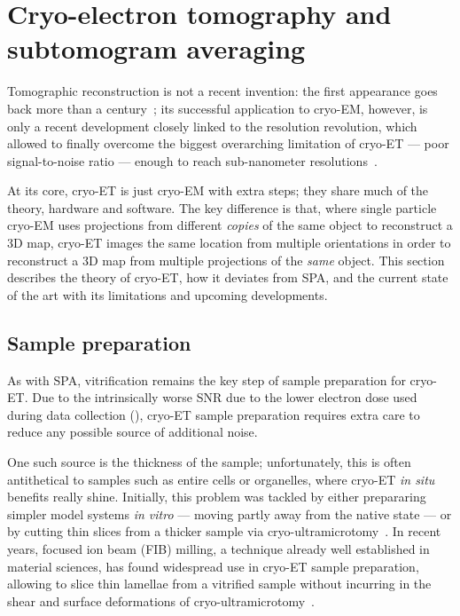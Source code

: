 \chapter[Cryo-ET and STA]{Cryo-electron tomography and subtomogram averaging}

Tomographic reconstruction is not a recent invention: the first appearance goes back more than a century~\cite{jDeterminationFunctionsTheir1917}; its successful application to cryo-EM, however, is only a recent development closely linked to the resolution revolution, which allowed to finally overcome the biggest overarching limitation of cryo-ET --- poor signal-to-noise ratio --- enough to reach sub-nanometer resolutions~\cite{lucicCryoelectronTomographyChallenge2013,turkPromiseChallengesCryoelectron2020}.

At its core, cryo-ET is just cryo-EM with extra steps; they share much of the theory, hardware and software.
The key difference is that, where single particle cryo-EM uses projections from different \textit{copies} of the same object to reconstruct a 3D map, cryo-ET images the same location from multiple orientations in order to reconstruct a 3D map from multiple projections of the \textit{same} object.
This section describes the theory of cryo-ET, how it deviates from SPA, and the current state of the art with its limitations and upcoming developments.

\section{Sample preparation}
As with SPA, vitrification remains the key step of sample preparation for cryo-ET.
Due to the intrinsically worse SNR due to the lower electron dose used during data collection (), cryo-ET sample preparation requires extra care to reduce any possible source of additional noise.

One such source is the thickness of the sample; unfortunately, this is often antithetical to samples such as entire cells or organelles, where cryo-ET \textit{in situ} benefits really shine.
Initially, this problem was tackled by either prepararing simpler model systems \textit{in vitro} --- moving partly away from the native state --- or by cutting thin slices from a thicker sample via cryo-ultramicrotomy~\cite{peaseElectronMicroscopyUltramicrotomy1981}.
In recent years, focused ion beam (FIB) milling, a technique already well established in material sciences, has found widespread use in cryo-ET sample preparation, allowing to slice thin lamellae from a vitrified sample without incurring in the shear and surface deformations of cryo-ultramicrotomy~\cite{markoFocusedionbeamThinningFrozenhydrated2007}.

